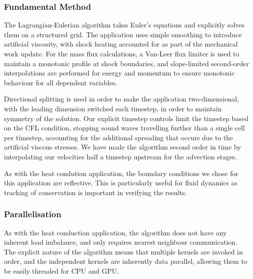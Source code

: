 \documentclass[runningheads,a4paper]{llncs}
\begin{document}
\subsubsection{Fundamental Method}

The Lagrangian-Eulerian algorithm takes Euler's equations and explicitly solves them on a structured grid. The application uses simple smoothing to introduce artificial viscosity, with shock heating accounted for as part of the mechanical work update. For the mass flux calculations, a Van-Leer flux limiter is used to maintain a monotonic profile at shock boundaries, and slope-limited second-order interpolations are performed for energy and momentum to ensure monotonic behaviour for all dependent variables.

Directional splitting is used in order to make the application two-dimensional, with the leading dimension switched each timestep, in order to maintain symmetry of the solution. Our explicit timestep controls limit the timestep based on the CFL condition, stopping sound waves travelling further than a single cell per timestep, accounting for the additional spreading that occurs due to the artificial viscous stresses. We have made the algorithm second order in time by interpolating our velocities half a timestep upstream for the advection stages.

As with the heat condution application, the boundary conditions we chose for this application are reflective. This is particularly useful for fluid dynamics as tracking of conservation is important in verifying the results.

\subsubsection{Parallelisation}

As with the heat conduction application, the algorithm does not have any inherent load imbalance, and only requires nearest neighbour communication. The explicit nature of the algorithm means that multiple kernels are invoked in order, and the independent kernels are inherently data parallel, allowing them to be easily threaded for CPU and GPU.
\end{document}
